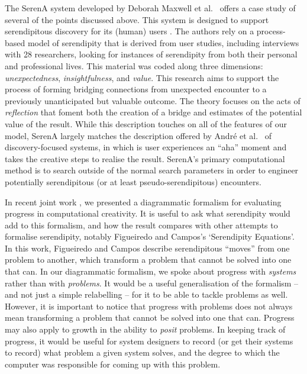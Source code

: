 The {\sf SerenA} system developed by Deborah Maxwell et al.~\citeyear{maxwell2012designing} offers a case study of several of the points discussed above.
This system is designed to support serendipitous discovery for its (human) users
\cite{forth2013serena}.  The authors rely on a process-based model of
serendipity \cite{Makri2012,Makri2012a} that is derived from user
studies, including interviews with 28 researchers, looking for
instances of serendipity from both their personal and professional
lives.  This material was coded along three dimensions:
\emph{unexpectedness}, \emph{insightfulness}, and \emph{value}.  This
research aims to support the process of forming bridging connections
from unexpected encounter to a previously unanticipated but valuable
outcome.  The theory focuses on the acts of \emph{reflection}
that foment both the creation of a bridge and estimates of the
potential value of the result.
%
While this description touches on all of the features of our model, {\sf
  SerenA} largely matches the description offered by Andr{\'e} et
al.~\citeyear{andre2009discovery} of discovery-focused systems, in which
is user experiences an ``aha'' moment and takes the
creative steps to realise the result.  {\sf SerenA}'s primary computational method is to
search outside of the normal search parameters in order to engineer
potentially serendipitous (or at least pseudo-serendipitous)
encounters.

In recent joint work \cite{colton-assessingprogress}, we presented a
diagrammatic formalism for evaluating progress in computational
creativity.  It is useful to ask what serendipity would add to this
formalism, and how the result compares with other attempts to
formalise serendipity, notably Figueiredo and Campos's
\citeyear{Figueiredo2001} `Serendipity Equations'.  In this work,
Figueiredo and Campos describe serendipitous ``moves'' from one
problem to another, which transform a problem that cannot be solved
into one that can.  In our diagrammatic formalism, we spoke about
progress with \emph{systems} rather than with \emph{problems}.  It
would be a useful generalisation of the formalism -- and not just a
simple relabelling -- for it to be able to tackle problems as well.
However, it is important to notice that progress with problems does not always mean transforming a
problem that cannot be solved into one that can.  Progress may also
apply to growth in the ability to \emph{posit} problems.  In keeping
track of progress, it would be useful for system designers to record
(or get their systems to record) what problem a given system solves,
and the degree to which the computer was responsible for coming up
with this problem.

